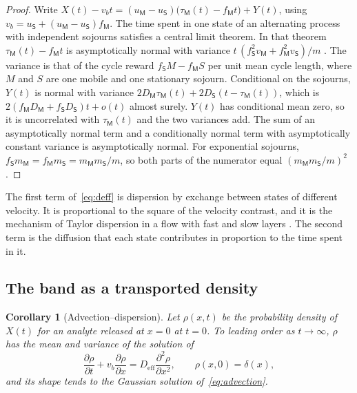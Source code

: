 \documentclass[11pt,a4paper]{article}
\newtheorem{corollary}[theorem]{Corollary}
\theoremstyle{definition}
\theoremstyle{remark}
\newcommand{\Mob}{\mathsf{M}}
\newcommand{\Sta}{\mathsf{S}}
\begin{document}
\begin{proof}
Write $X(t)-v_bt=(u_\Mob-u_\Sta)\bigl(\tau_\Mob(t)-f_\Mob t\bigr)+Y(t)$, using $v_b=u_\Sta+(u_\Mob-u_\Sta)f_\Mob$.
The time spent in one state of an alternating process with independent sojourns satisfies a central limit theorem.
In that theorem $\tau_\Mob(t)-f_\Mob t$ is asymptotically normal with variance $t\,(f_\Sta^{2}v_\Mob+f_\Mob^{2}v_\Sta)/m$ \citep{takacs1957,cox1962}.
The variance is that of the cycle reward $f_\Sta M-f_\Mob S$ per unit mean cycle length, where $M$ and $S$ are one mobile and one stationary sojourn.
Conditional on the sojourns, $Y(t)$ is normal with variance $2D_\Mob\tau_\Mob(t)+2D_\Sta(t-\tau_\Mob(t))$, which is $2(f_\Mob D_\Mob+f_\Sta D_\Sta)t+o(t)$ almost surely.
$Y(t)$ has conditional mean zero, so it is uncorrelated with $\tau_\Mob(t)$ and the two variances add.
The sum of an asymptotically normal term and a conditionally normal term with asymptotically constant variance is asymptotically normal.
For exponential sojourns, $f_\Sta m_\Mob=f_\Mob m_\Sta=m_\Mob m_\Sta/m$, so both parts of the numerator equal $(m_\Mob m_\Sta/m)^{2}$.
\end{proof}

The first term of~\eqref{eq:deff} is dispersion by exchange between states of different velocity.
It is proportional to the square of the velocity contrast, and it is the mechanism of Taylor dispersion in a flow with fast and slow layers \citep{taylor1953,aris1956}.
The second term is the diffusion that each state contributes in proportion to the time spent in it.

\subsection{The band as a transported density}

\begin{corollary}[Advection--dispersion]
\label{cor:advection}
Let $\rho(x,t)$ be the probability density of $X(t)$ for an analyte released at $x=0$ at $t=0$.
To leading order as $t\to\infty$, $\rho$ has the mean and variance of the solution of
\begin{equation}
\frac{\partial\rho}{\partial t}+v_b\frac{\partial\rho}{\partial x}=D_{\mathrm{eff}}\frac{\partial^{2}\rho}{\partial x^{2}},
\qquad\rho(x,0)=\delta(x),
\label{eq:advection}
\end{equation}
and its shape tends to the Gaussian solution of~\eqref{eq:advection}.
\end{corollary}
\end{document}
